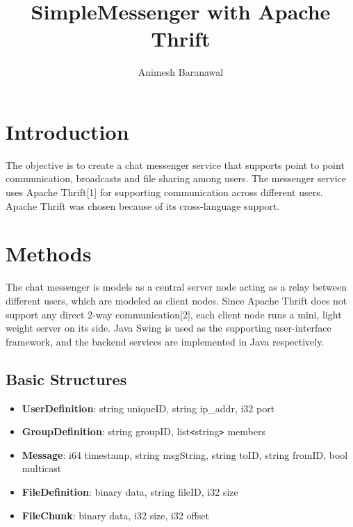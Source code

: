 \documentclass[a4paper,10pt]{article}
\title{SimpleMessenger with Apache Thrift}
\author{Animesh Baranawal}
\begin{document}
\maketitle

\section{Introduction}
The objective is to create a chat messenger service that supports point to point communication, broadcasts and file sharing among users. The messenger service uses Apache Thrift[1] for supporting communication across different users. Apache Thrift was chosen because of its cross-language support.
 
 
\section{Methods}
The chat messenger is models as a central server node acting as a relay between different users, which are modeled as client nodes. Since Apache Thrift does not support any direct 2-way communication[2], each client node runs a mini, light weight server on its side. Java Swing is used as the supporting user-interface framework, and the backend services are implemented in Java respectively.

\subsection{Basic Structures}
\begin{itemize}
    \item \textbf{UserDefinition}: string uniqueID, string ip\_addr, i32 port
    \item \textbf{GroupDefinition}: string groupID, list\texttt{<}string\texttt{>} members
    \item \textbf{Message}: i64 timestamp, string msgString, string toID, string fromID, bool multicast
    \item \textbf{FileDefinition}: binary data, string fileID, i32 size
    \item \textbf{FileChunk}: binary data, i32 size, i32 offset
\end{itemize}
\end{document}
